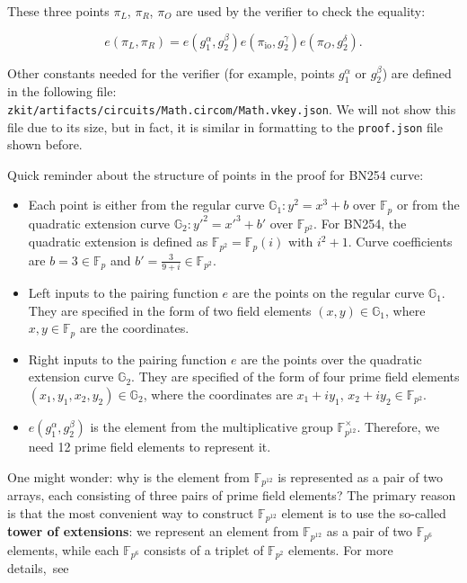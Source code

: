 \documentclass[../lecture-notes-148x210.tex]{subfiles}
\begin{document}
These three points $\pi_L$, $\pi_R$, $\pi_O$ are used by the verifier to check the equality:

\vspace{-0.5em}

\[
    e(\pi_L, \pi_R) = e(g_1^\alpha, g_2^\beta)e(\pi_{\text{io}},g_2^\gamma)e(\pi_O,g_2^\delta).
\]

\vspace{-0.5em}

Other constants needed for the verifier (for example, points $g_1^{\alpha}$ or $g_2^{\beta}$) are defined
in the following file: \\ \texttt{zkit/artifacts/circuits/Math.circom/Math.vkey.json}. 
We will not show this file due to its size, but in fact, it is similar in formatting to the \texttt{proof.json}
file shown before.

Quick reminder about the structure of points in the proof for BN254 curve:
\begin{itemize}
    \item Each point is either from the regular curve $\mathbb{G}_1: y^2=x^3+b$ over $\mathbb{F}_p$ or from the quadratic extension curve $\mathbb{G}_2: y'^2=x'^3+b'$ over $\mathbb{F}_{p^2}$. For BN254, the quadratic extension is defined as $\mathbb{F}_{p^2} = \mathbb{F}_p(i)$ with $i^2+1$. Curve coefficients are $b=3 \in \mathbb{F}_p$ and $b'=\frac{3}{9+i} \in \mathbb{F}_{p^2}$.
    \item Left inputs to the pairing function $e$ are the points on the regular curve $\mathbb{G}_1$. They are specified in the form of two field elements $(x,y) \in \mathbb{G}_1$, where $x, y \in \mathbb{F}_p$ are the coordinates.
    \item Right inputs to the pairing function $e$ are the points over the quadratic extension curve $\mathbb{G}_2$. They are specified of the form of four prime field elements $(x_{1}, y_{1}, x_{2}, y_2) \in \mathbb{G}_2$, where the coordinates are $x_1+iy_1$, $x_2+iy_2 \in \mathbb{F}_{p^2}$.
    \item $e(g_1^{\alpha}, g_2^{\beta})$ is the element from the multiplicative group $\mathbb{F}_{p^{12}}^{\times}$. Therefore, we need 12 prime field elements to represent it.
\end{itemize}

\begin{remark}
    One might wonder: why is the element from $\mathbb{F}_{p^{12}}$ is represented as a pair of two arrays,
    each consisting of three pairs of prime field elements? The primary reason is that the most convenient
    way to construct $\mathbb{F}_{p^{12}}$ element is to use the so-called \textbf{tower of extensions}: we represent
    an element from $\mathbb{F}_{p^{12}}$ as a pair of two $\mathbb{F}_{p^6}$ elements, while each $\mathbb{F}_{p^6}$
    consists of a triplet of $\mathbb{F}_{p^2}$ elements. For more details,~see~
\end{remark}
\end{document}
